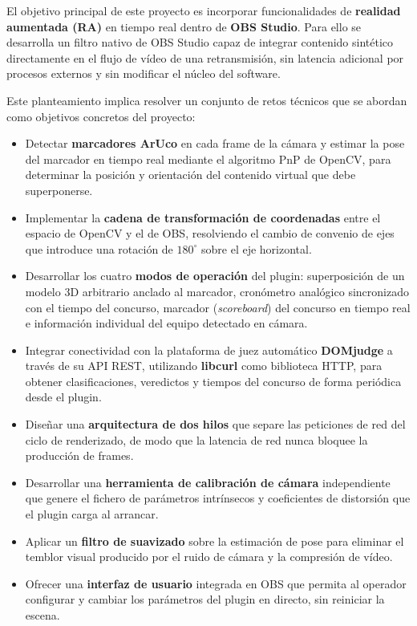 El objetivo principal de este proyecto es incorporar funcionalidades de \textbf{realidad aumentada (RA)} en tiempo real dentro de \textbf{OBS Studio}. Para ello se desarrolla un filtro nativo de OBS Studio capaz de integrar contenido sintético directamente en el flujo de vídeo de una retransmisión, sin latencia adicional por procesos externos y sin modificar el núcleo del software.

Este planteamiento implica resolver un conjunto de retos técnicos que se abordan como objetivos concretos del proyecto:

\begin{itemize}
  \item Detectar \textbf{marcadores ArUco} en cada frame de la cámara y estimar la pose del marcador en tiempo real mediante el algoritmo PnP de OpenCV, para determinar la posición y orientación del contenido virtual que debe superponerse.
  \item Implementar la \textbf{cadena de transformación de coordenadas} entre el espacio de OpenCV y el de OBS, resolviendo el cambio de convenio de ejes que introduce una rotación de $180^\circ$ sobre el eje horizontal.
  \item Desarrollar los cuatro \textbf{modos de operación} del plugin: superposición de un modelo 3D arbitrario anclado al marcador, cronómetro analógico sincronizado con el tiempo del concurso, marcador (\textit{scoreboard}) del concurso en tiempo real e información individual del equipo detectado en cámara.
  \item Integrar conectividad con la plataforma de juez automático \textbf{DOMjudge} a través de su API REST, utilizando \textbf{libcurl} como biblioteca HTTP, para obtener clasificaciones, veredictos y tiempos del concurso de forma periódica desde el plugin.
  \item Diseñar una \textbf{arquitectura de dos hilos} que separe las peticiones de red del ciclo de renderizado, de modo que la latencia de red nunca bloquee la producción de frames.
  \item Desarrollar una \textbf{herramienta de calibración de cámara} independiente que genere el fichero de parámetros intrínsecos y coeficientes de distorsión que el plugin carga al arrancar.
  \item Aplicar un \textbf{filtro de suavizado} sobre la estimación de pose para eliminar el temblor visual producido por el ruido de cámara y la compresión de vídeo.
  \item Ofrecer una \textbf{interfaz de usuario} integrada en OBS que permita al operador configurar y cambiar los parámetros del plugin en directo, sin reiniciar la escena.
\end{itemize}

